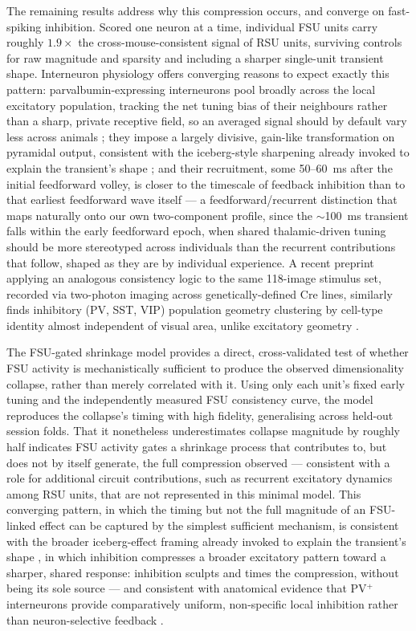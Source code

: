 \documentclass[11pt,onecolumn]{article}
\begin{document}
The remaining results address why this compression occurs, and converge
on fast-spiking inhibition. Scored one neuron at a time, individual FSU
units carry roughly $1.9\times$ the cross-mouse-consistent signal of RSU
units, surviving controls for raw magnitude and sparsity and including a
sharper single-unit transient shape. Interneuron physiology offers
converging reasons to expect exactly this pattern: parvalbumin-expressing
interneurons pool broadly across the local excitatory population, tracking
the net tuning bias of their neighbours rather than a sharp, private
receptive field, so an averaged signal should by default vary less across
animals \citep{kerlin2010}; they impose a largely divisive, gain-like
transformation on pyramidal output, consistent with the iceberg-style
sharpening already invoked to explain the transient's shape
\citep{atallah2012, shapiro2022, troyer1998}; and their recruitment, some
50--60~ms after the initial feedforward volley, is closer to the timescale
of feedback inhibition than to that earliest feedforward wave itself
\citep{lamme2000, kirchberger2023, isaacson2011} --- a feedforward/recurrent
distinction that maps naturally onto our own two-component profile, since
the $\sim$100~ms transient falls within the early feedforward epoch, when
shared thalamic-driven tuning should be more stereotyped across
individuals than the recurrent contributions that follow, shaped as they
are by individual experience. A recent preprint applying
an analogous consistency logic to the same 118-image stimulus set, recorded via
two-photon imaging across genetically-defined Cre lines, similarly finds
inhibitory (PV, SST, VIP) population geometry clustering by cell-type
identity almost independent of visual area, unlike excitatory geometry
\citep{toosi2025}.

The FSU-gated shrinkage model provides a direct, cross-validated test of
whether FSU activity is mechanistically sufficient to produce the observed
dimensionality collapse, rather than merely correlated with it. Using only
each unit's fixed early tuning and the independently measured FSU
consistency curve, the model reproduces the collapse's timing with high
fidelity, generalising across held-out session folds. That it nonetheless
underestimates collapse magnitude by roughly half indicates FSU activity
gates a shrinkage process that contributes to, but does not by itself
generate, the full compression observed --- consistent with a role for
additional circuit contributions, such as recurrent excitatory dynamics
among RSU units, that are not represented in this minimal model. This
converging pattern, in which the timing but not the full magnitude of an
FSU-linked effect can be captured by the simplest sufficient mechanism, is
consistent with the broader iceberg-effect framing already invoked to
explain the transient's shape \citep{shapiro2022, troyer1998}, in which
inhibition compresses a broader excitatory pattern toward a sharper,
shared response: inhibition sculpts and times the compression, without
being its sole source --- and consistent with anatomical evidence that
PV$^+$ interneurons provide comparatively uniform, non-specific local
inhibition rather than neuron-selective feedback \citep{packer2011}.
\end{document}
